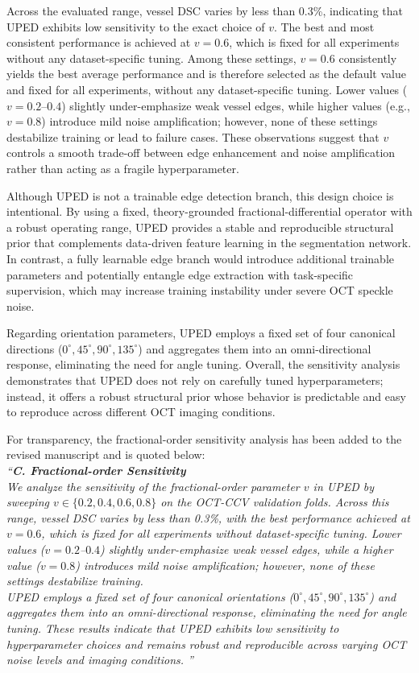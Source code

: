 \documentclass[11pt]{article}
\begin{document}
\begin{enumerate}
{    Across the evaluated range, vessel DSC varies by less than 0.3\%, indicating that UPED exhibits low sensitivity to the exact choice of $v$. The best and most consistent performance is achieved at $v=0.6$, which is fixed for all experiments without any dataset-specific tuning.
    Among these settings, $v=0.6$ consistently yields the best average performance and is therefore selected as the default value and fixed for all experiments, without any dataset-specific tuning.
    Lower values ($v=0.2$--$0.4$) slightly under-emphasize weak vessel edges, while higher values (e.g., $v=0.8$) introduce mild noise amplification; however, none of these settings destabilize training or lead to failure cases.
    These observations suggest that $v$ controls a smooth trade-off between edge enhancement and noise amplification rather than acting as a fragile hyperparameter.
    
    Although UPED is not a trainable edge detection branch, this design choice is intentional.
    By using a fixed, theory-grounded fractional-differential operator with a robust operating range, UPED provides a stable and reproducible structural prior that complements data-driven feature learning in the segmentation network.
    In contrast, a fully learnable edge branch would introduce additional trainable parameters and potentially entangle edge extraction with task-specific supervision, which may increase training instability under severe OCT speckle noise.
    
    Regarding orientation parameters, UPED employs a fixed set of four canonical directions ($0^\circ,45^\circ,90^\circ,135^\circ$) and aggregates them into an omni-directional response, eliminating the need for angle tuning.
    Overall, the sensitivity analysis demonstrates that UPED does not rely on carefully tuned hyperparameters; instead, it offers a robust structural prior whose behavior is predictable and easy to reproduce across different OCT imaging conditions.
    
    For transparency, the fractional-order sensitivity analysis has been added to the revised manuscript and is quoted below:\\
    \textit{{\color{blue}``\textbf{C. Fractional-order Sensitivity}\\
    We analyze the sensitivity of the fractional-order parameter $v$ in UPED by sweeping $v\in\{0.2,0.4,0.6,0.8\}$ on the OCT-CCV validation folds.
    Across this range, vessel DSC varies by less than 0.3\%, with the best performance achieved at $v=0.6$, which is fixed for all experiments without dataset-specific tuning.
    Lower values ($v=0.2$--$0.4$) slightly under-emphasize weak vessel edges, while a higher value ($v=0.8$) introduces mild noise amplification; however, none of these settings destabilize training.\\
    UPED employs a fixed set of four canonical orientations ($0^\circ,45^\circ,90^\circ,135^\circ$) and aggregates them into an omni-directional response, eliminating the need for angle tuning.
    These results indicate that UPED exhibits low sensitivity to hyperparameter choices and remains robust and reproducible across varying OCT noise levels and imaging conditions.
    ''}}
    }


\end{enumerate}
\end{document}
